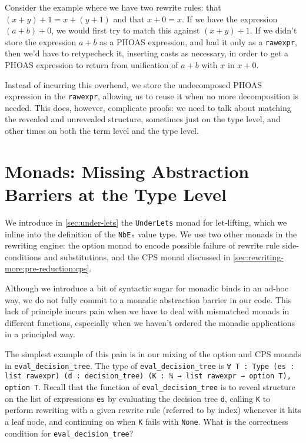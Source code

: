 Consider the example where we have two rewrite rules: that $(x + y) + 1 = x + (y + 1)$ and that $x + 0 = x$.
If we have the expression $(a + b) + 0$, we would first try to match this against $(x + y) + 1$.
If we didn't store the expression $a + b$ as a PHOAS expression, and had it only as a \texttt{rawexpr}, then we'd have to retypecheck it, inserting casts as necessary, in order to get a PHOAS expression to return from unification of $a + b$ with $x$ in $x + 0$.

Instead of incurring this overhead, we store the undecomposed PHOAS expression in the \texttt{rawexpr}, allowing us to reuse it when no more decomposition is needed.
This does, however, complicate proofs: we need to talk about matching the revealed and unrevealed structure, sometimes just on the type level, and other times on both the term level and the type level.

\section{Monads: Missing Abstraction Barriers at the Type Level}\label{sec:rewriting-more:monads}
We introduce in \autoref{sec:under-lets} the \texttt{UnderLets} monad for let-lifting, which we inline into the definition of the \texttt{NbEₜ} value type.
We use two other monads in the rewriting engine: the option monad to encode possible failure of rewrite rule side-conditions and substitutions, and the CPS monad discussed in \autoref{sec:rewriting-more:pre-reduction:cps}.

Although we introduce a bit of syntactic sugar for monadic binds in an ad-hoc way, we do not fully commit to a monadic abstraction barrier in our code.
This lack of principle incurs pain when we have to deal with mismatched monads in different functions, especially when we haven't ordered the monadic applications in a principled way.

The simplest example of this pain is in our mixing of the option and CPS monads in \texttt{eval_decision_tree}.
The type of \texttt{eval_decision_tree} is \texttt{∀ {T : Type} (es : list rawexpr) (d : decision_tree) (K : ℕ → list rawexpr → option T), option T}.
Recall that the function of \texttt{eval_decision_tree} is to reveal structure on the list of expressions \texttt{es} by evaluating the decision tree \texttt{d}, calling \texttt{K} to perform rewriting with a given rewrite rule (referred to by index) whenever it hits a leaf node, and continuing on when \texttt{K} fails with \texttt{None}.
What is the correctness condition for \texttt{eval_decision_tree}?

